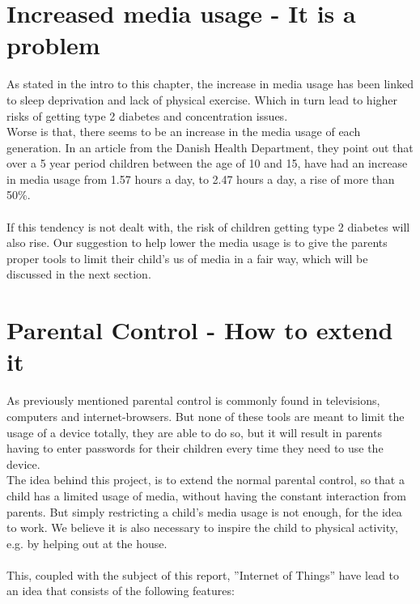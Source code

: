 \section{Increased media usage - It is a problem}
As stated in the intro to this chapter, the increase in media usage has been linked to sleep deprivation and lack of physical exercise. Which in turn lead to higher risks of getting type 2 diabetes and concentration issues.\\
Worse is that, there seems to be an increase in the media usage of each generation. In an article from the Danish Health Department, they point out that over a 5 year period children between the age of 10 and 15, have had an increase in media usage from 1.57 hours a day, to 2.47 hours a day, a rise of more than 50\%.\citep{sundhedsstyrelsen}\\
\\
If this tendency is not dealt with, the risk of children getting type 2 diabetes will also rise. Our suggestion to help lower the media usage is to give the parents proper tools to limit their child’s us of media in a fair way, which will be discussed in the next section.


\section{Parental Control - How to extend it}
\label{section:pcHowToExtend}
As previously mentioned parental control is commonly found in televisions, computers and internet-browsers. But none of these tools are meant to limit the usage of a device totally, they are able to do so, but it will result in parents having to enter passwords for their children every time they need to use the device.\\
The idea behind this project, is to extend the normal parental control, so that a child has a limited usage of media, without having the constant interaction from parents. 
But simply restricting a child's media usage is not enough, for the idea to work. We believe it is also necessary to inspire the child to physical activity, e.g. by helping out at the house.\\
\\
This, coupled with the subject of this report, ''Internet of Things'' have lead to an idea that consists of the following features:

